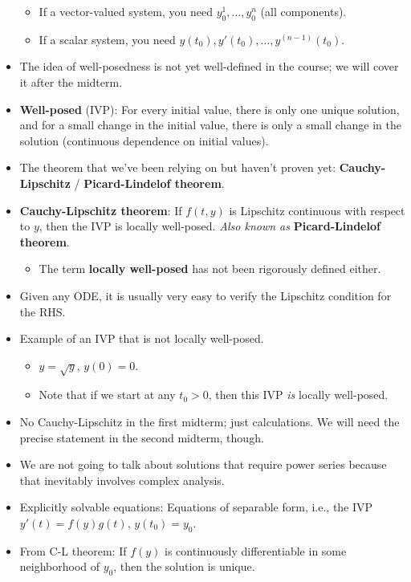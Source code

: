 \documentclass[../notes.tex]{subfiles}
\begin{document}
\begin{itemize}
    \begin{itemize}
        \item If a vector-valued system, you need $y_0^1,\dots,y_0^n$ (all components).
        \item If a scalar system, you need $y(t_0),y'(t_0),\dots,y^{(n-1)}(t_0)$.
    \end{itemize}
    \item The idea of well-posedness is not yet well-defined in the course; we will cover it after the midterm.
    \item \textbf{Well-posed} (IVP): For every initial value, there is only one unique solution, and for a small change in the initial value, there is only a small change in the solution (continuous dependence on initial values).
    \item The theorem that we've been relying on but haven't proven yet: \textbf{Cauchy-Lipschitz} / \textbf{Picard-Lindelof theorem}.
    \item \textbf{Cauchy-Lipschitz theorem}: If $f(t,y)$ is Lipschitz continuous with respect to $y$, then the IVP is locally well-posed. \emph{Also known as} \textbf{Picard-Lindelof theorem}.
    \begin{itemize}
        \item The term \textbf{locally well-posed} has not been rigorously defined either.
    \end{itemize}
    \item Given any ODE, it is usually very easy to verify the Lipschitz condition for the RHS.
    \item Example of an IVP that is not locally well-posed.
    \begin{itemize}
        \item $y=\sqrt{y}$, $y(0)=0$.
        \item Note that if we start at any $t_0>0$, then this IVP \emph{is} locally well-posed.
    \end{itemize}
    \item No Cauchy-Lipschitz in the first midterm; just calculations. We will need the precise statement in the second midterm, though.
    \item We are not going to talk about solutions that require power series because that inevitably involves complex analysis.
    \item Explicitly solvable equations: Equations of separable form, i.e., the IVP $y'(t)=f(y)g(t)$, $y(t_0)=y_0$.
    \item From C-L theorem: If $f(y)$ is continuously differentiable in some neighborhood of $y_0$, then the solution is unique.

\end{itemize}
\end{document}
